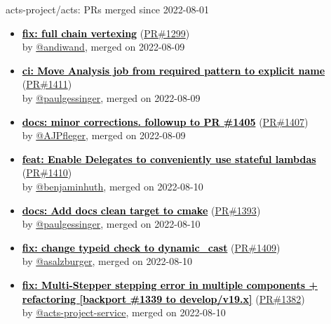 \documentclass{beamer}
\begin{document}
\begin{frame}[allowframebreaks]{ acts-project/acts: PRs merged since 2022-08-01 }
\begin{itemize}
    \item
    \textbf{\href{https://github.com/acts-project/acts/pull/1299}{\textcolor{black}{fix: full chain vertexing}}}
    (\href{https://github.com/acts-project/acts/pull/1299}{PR\#1299}) \\
    by \href{https://github.com/andiwand}{ @andiwand}, merged on 2022-08-09

    \item
    \textbf{\href{https://github.com/acts-project/acts/pull/1411}{\textcolor{black}{ci: Move Analysis job from required pattern to explicit name}}}
    (\href{https://github.com/acts-project/acts/pull/1411}{PR\#1411}) \\
    by \href{https://github.com/paulgessinger}{ @paulgessinger}, merged on 2022-08-09

    \item
    \textbf{\href{https://github.com/acts-project/acts/pull/1407}{\textcolor{black}{docs: minor corrections. followup to PR \#1405}}}
    (\href{https://github.com/acts-project/acts/pull/1407}{PR\#1407}) \\
    by \href{https://github.com/AJPfleger}{ @AJPfleger}, merged on 2022-08-09

    \item
    \textbf{\href{https://github.com/acts-project/acts/pull/1410}{\textcolor{black}{feat: Enable Delegates to conveniently use stateful lambdas}}}
    (\href{https://github.com/acts-project/acts/pull/1410}{PR\#1410}) \\
    by \href{https://github.com/benjaminhuth}{ @benjaminhuth}, merged on 2022-08-10

    \item
    \textbf{\href{https://github.com/acts-project/acts/pull/1393}{\textcolor{black}{docs: Add docs clean target to cmake}}}
    (\href{https://github.com/acts-project/acts/pull/1393}{PR\#1393}) \\
    by \href{https://github.com/paulgessinger}{ @paulgessinger}, merged on 2022-08-10

    \item
    \textbf{\href{https://github.com/acts-project/acts/pull/1409}{\textcolor{black}{fix: change typeid check to dynamic\_cast}}}
    (\href{https://github.com/acts-project/acts/pull/1409}{PR\#1409}) \\
    by \href{https://github.com/asalzburger}{ @asalzburger}, merged on 2022-08-10

    \item
    \textbf{\href{https://github.com/acts-project/acts/pull/1382}{\textcolor{black}{fix: Multi-Stepper stepping error in multiple components + refactoring [backport \#1339 to develop/v19.x]}}}
    (\href{https://github.com/acts-project/acts/pull/1382}{PR\#1382}) \\
    by \href{https://github.com/acts-project-service}{ @acts-project-service}, merged on 2022-08-10


\end{itemize}
\end{frame}
\end{document}
